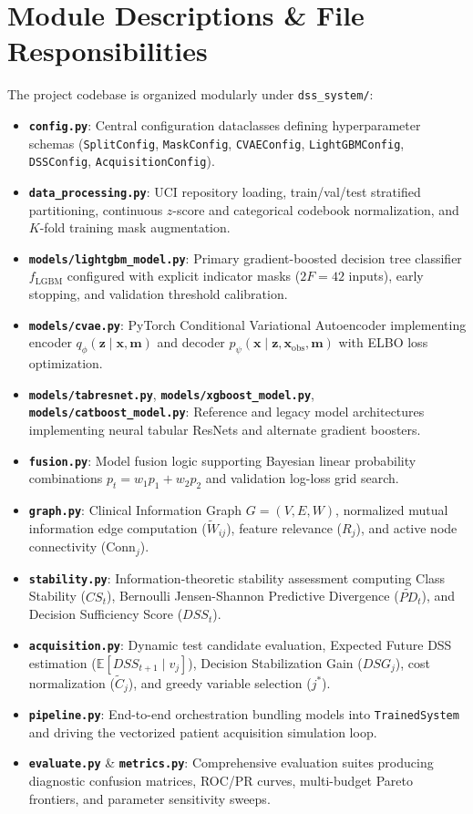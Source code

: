 \documentclass[11pt,a4paper]{report}
\begin{document}
\section{Module Descriptions \& File Responsibilities}
The project codebase is organized modularly under \texttt{dss\_system/}:
\begin{itemize}[leftmargin=*]
  \item \textbf{\texttt{config.py}}: Central configuration dataclasses defining hyperparameter schemas (\texttt{SplitConfig}, \texttt{MaskConfig}, \texttt{CVAEConfig}, \texttt{LightGBMConfig}, \texttt{DSSConfig}, \texttt{AcquisitionConfig}).
  \item \textbf{\texttt{data\_processing.py}}: UCI repository loading, train/val/test stratified partitioning, continuous $z$-score and categorical codebook normalization, and $K$-fold training mask augmentation.
  \item \textbf{\texttt{models/lightgbm\_model.py}}: Primary gradient-boosted decision tree classifier $f_{\text{LGBM}}$ configured with explicit indicator masks ($2F=42$ inputs), early stopping, and validation threshold calibration.
  \item \textbf{\texttt{models/cvae.py}}: PyTorch Conditional Variational Autoencoder implementing encoder $q_\phi(\mathbf{z} \mid \mathbf{x}, \mathbf{m})$ and decoder $p_\psi(\mathbf{x} \mid \mathbf{z}, \mathbf{x}_{\text{obs}}, \mathbf{m})$ with ELBO loss optimization.
  \item \textbf{\texttt{models/tabresnet.py}}, \textbf{\texttt{models/xgboost\_model.py}}, \textbf{\texttt{models/catboost\_model.py}}: Reference and legacy model architectures implementing neural tabular ResNets and alternate gradient boosters.
  \item \textbf{\texttt{fusion.py}}: Model fusion logic supporting Bayesian linear probability combinations $p_t = w_1 p_1 + w_2 p_2$ and validation log-loss grid search.
  \item \textbf{\texttt{graph.py}}: Clinical Information Graph $G=(V, E, W)$, normalized mutual information edge computation ($\tilde{W}_{ij}$), feature relevance ($R_j$), and active node connectivity ($\text{Conn}_j$).
  \item \textbf{\texttt{stability.py}}: Information-theoretic stability assessment computing Class Stability ($CS_t$), Bernoulli Jensen-Shannon Predictive Divergence ($\widetilde{PD}_t$), and Decision Sufficiency Score ($DSS_t$).
  \item \textbf{\texttt{acquisition.py}}: Dynamic test candidate evaluation, Expected Future DSS estimation ($\mathbb{E}[DSS_{t+1} \mid v_j]$), Decision Stabilization Gain ($DSG_j$), cost normalization ($\tilde{C}_j$), and greedy variable selection ($j^*$).
  \item \textbf{\texttt{pipeline.py}}: End-to-end orchestration bundling models into \texttt{TrainedSystem} and driving the vectorized patient acquisition simulation loop.
  \item \textbf{\texttt{evaluate.py}} \& \textbf{\texttt{metrics.py}}: Comprehensive evaluation suites producing diagnostic confusion matrices, ROC/PR curves, multi-budget Pareto frontiers, and parameter sensitivity sweeps.
\end{itemize}
\end{document}
